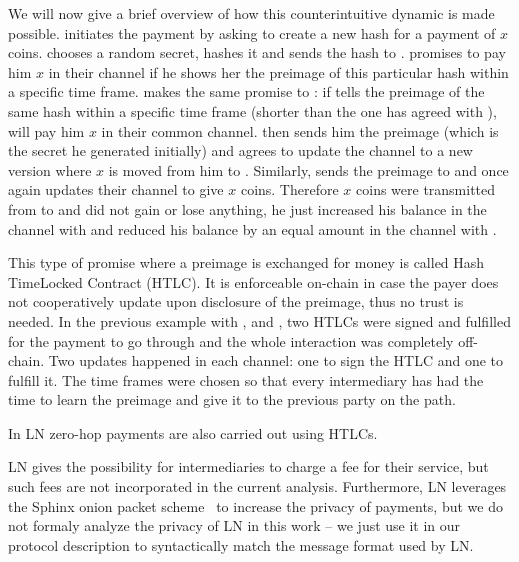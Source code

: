     We will now give a brief overview of how this counterintuitive dynamic
    is made possible. \alice{} initiates the payment by asking \charlie{} to
    create a new hash for a payment of $x$ coins. \charlie{} chooses a random
    secret, hashes it and sends the hash to \alice. \alice{} promises \bob{} to
    pay him $x$ in their channel if he shows her the preimage of this particular
    hash within a specific time frame. \bob{} makes the same promise to
    \charlie{}: if \charlie{} tells \bob{} the preimage of the same hash within
    a specific time frame (shorter than the one \bob{} has agreed with
    \alice{}), \bob{} will pay him $x$ in their common channel. \charlie{} then
    sends him the preimage (which is the secret he generated initially) and
    \bob{} agrees to update the channel to a new version where $x$ is moved from
    him to \charlie. Similarly, \bob{} sends the preimage to \alice{} and once
    again \alice{} updates their channel to give \bob{} $x$ coins. Therefore $x$
    coins were transmitted from \alice{} to \charlie{} and \bob{} did not gain
    or lose anything, he just increased his balance in the channel with \alice{}
    and reduced his balance by an equal amount in the channel with \charlie.

    This type of promise where a preimage is exchanged for money is called Hash
    TimeLocked Contract (HTLC). It is enforceable on-chain in case the payer
    does not cooperatively update upon disclosure of the preimage, thus no trust
    is needed. In the previous example with \alice{}, \bob{} and \charlie, two
    HTLCs were signed and fulfilled for the payment to go through and the whole
    interaction was completely off-chain. Two updates happened in each channel:
    one to sign the HTLC and one to fulfill it. The time frames were chosen so
    that every intermediary has had the time to learn the preimage and give it
    to the previous party on the path.

    In LN zero-hop payments are also carried out using HTLCs.

    LN gives the possibility for intermediaries to charge a fee for their
    service, but such fees are not incorporated in the current analysis.
    Furthermore, LN leverages the Sphinx onion packet scheme~\cite{sphinx} to
    increase the privacy of payments, but we do not formaly analyze the privacy
    of LN in this work -- we just use it in our protocol description to
    syntactically match the message format used by LN.
